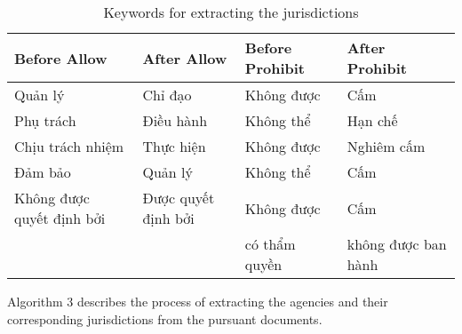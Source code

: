 \begin{algorithm}
    \begin{table}[H]
        \begin{tabular}{|p{3cm}|p{3cm}|p{3cm}|p{3cm}|}
            \hline
            Before Allow & After Allow & Before Prohibit & After Prohibit \\
            \hline
            Quản lý & Chỉ đạo & Không được & Cấm \\
            \hline
            Phụ trách & Điều hành & Không thể & Hạn chế \\
            \hline
            Chịu trách nhiệm & Thực hiện & Không được & Nghiêm cấm \\
            \hline
            Đảm bảo & Quản lý & Không thể & Cấm \\
            \hline
            Không được quyết định bởi & Được quyết định bởi & Không được & Cấm \\
            \hline
            & & có thẩm quyền & không được ban hành \\
        \end{tabular}
        \caption{Keywords for extracting the jurisdictions}
        \label{tab:keywords}
    \end{table}
    Algorithm 3 describes the process of extracting the agencies and their corresponding jurisdictions from the pursuant documents.


\end{algorithm}
